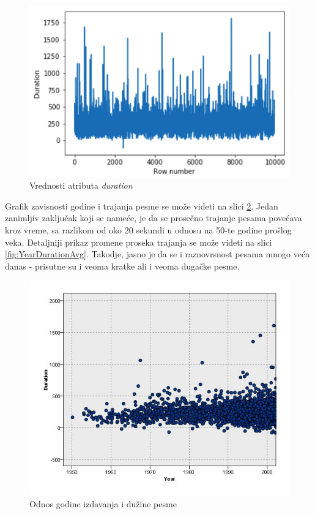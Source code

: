 \begin{figure}[H]
    \includegraphics[scale=0.6]{resources/duration.png}
    \caption{Vrednosti atributa \emph{duration}}
    \label{fig:duration}
\end{figure}

Grafik zavisnosti godine i trajanja pesme se mo\v{z}e videti na slici \ref{fig:YearDuration}. Jedan zanimljiv zaklju\v{c}ak koji se name\'c{}e, je da se prose\v{c}no trajanje pesama pove\'c{}ava kroz vreme, sa razlikom od oko 20 sekundi u odnosu na 50-te godine pro\v{s}log veka. Detaljniji prikaz promene proseka trajanja se mo\v{z}e videti na slici \ref{fig:YearDurationAvg}. Takodje, jasno je da se i raznovrsnost pesama mnogo ve\'c{}a danas - prisutne su i veoma kratke ali i veoma duga\v{c}ke pesme.


\begin{figure}[H]
    \centering
    \includegraphics[scale=0.6]{resources/year-duration.jpg}
    \caption{Odnos godine izdavanja i du\v{z}ine pesme}
    \label{fig:YearDuration}
\end{figure}


